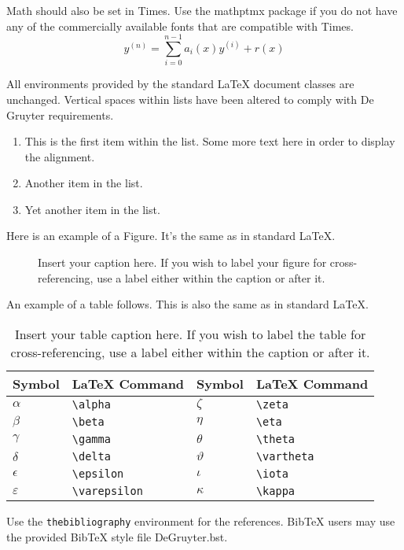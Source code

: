 \documentclass[letterpaper,12pt]{article}
\begin{document}
Math should also be set in Times. Use the mathptmx package if you do not have
any of the commercially available fonts that are compatible with Times.
\begin{equation}
    y^{(n)} = \sum_{i=0}^{n-1} a_i(x) y^{(i)} + r(x) 
\end{equation}

All environments provided by the standard LaTeX document classes are
unchanged. Vertical spaces within lists have been altered to comply with De Gruyter
requirements.
\begin{enumerate}
\item This is the first item within the list. Some more text here in order to display the alignment.
\item Another item in the list.
\item Yet another item in the list.
\end{enumerate}

Here is an example of a Figure. It's the same as in standard LaTeX.

\begin{figure}[!h]
\centering
\caption{Insert your caption here. If you wish to label your figure for
  cross-referencing, use a label either within the caption or after it.}
\label{fig1}
\end{figure}

An example of a table follows. This is also the same as in standard LaTeX.

\begin{table}[!h]
\centering
\caption{Insert your table caption here. If you wish to label the table for
  cross-referencing, use a label either within the caption or after it.}
\begin{tabular}{llll}
\hline
Symbol        & LaTeX Command      & Symbol      & LaTeX Command \\
\hline
$\alpha$      & \verb+\alpha+      & $\zeta$     & \verb+\zeta+ \\
$\beta$       & \verb+\beta+       & $\eta$      & \verb+\eta+ \\
$\gamma$      & \verb+\gamma+      & $\theta$    & \verb+\theta+ \\
$\delta$      & \verb+\delta+      & $\vartheta$ & \verb+\vartheta+ \\
$\epsilon$    & \verb+\epsilon+    & $\iota$     & \verb+\iota+ \\
$\varepsilon$ & \verb+\varepsilon+ & $\kappa$    & \verb+\kappa+ \\
\hline
\end{tabular}
\end{table}

Use the \verb+thebibliography+ environment for the references.  BibTeX users may
use the provided BibTeX style file DeGruyter.bst.



\end{document}
